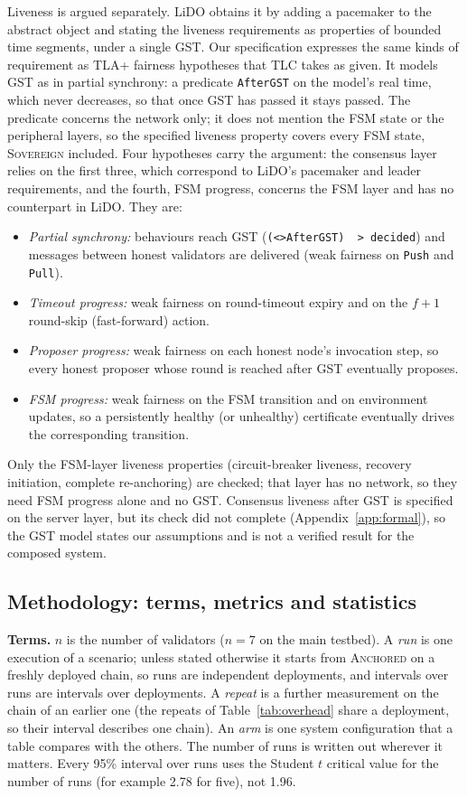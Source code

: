 Liveness is argued separately. LiDO obtains it by adding a pacemaker to the
abstract object and stating the liveness requirements as properties of
bounded time segments, under a single GST. Our specification expresses the
same kinds of requirement as TLA+ fairness hypotheses that TLC takes as given.
It models GST as in partial synchrony: a predicate \texttt{AfterGST} on the
model's real time, which never decreases, so that once GST has passed it stays
passed. The predicate concerns the network only; it does not mention the FSM
state or the peripheral layers, so the specified liveness property covers every
FSM state, \textsc{Sovereign} included. Four hypotheses carry the argument: the
consensus layer relies on the first three, which correspond to LiDO's pacemaker
and leader requirements, and the fourth, FSM progress, concerns the FSM layer and
has no counterpart in LiDO. They are:
\begin{itemize}
  \item \emph{Partial synchrony:} behaviours reach GST
  (\texttt{(<>AfterGST) \string~> decided}) and messages between honest
  validators are delivered (weak fairness on \texttt{Push} and \texttt{Pull}).
  \item \emph{Timeout progress:} weak fairness on round-timeout expiry and
  on the $f{+}1$ round-skip (fast-forward) action.
  \item \emph{Proposer progress:} weak fairness on each honest node's
  invocation step, so every honest proposer whose round is reached after
  GST eventually proposes.
  \item \emph{FSM progress:} weak fairness on the FSM transition and on
  environment updates, so a persistently healthy (or unhealthy)
  certificate eventually drives the corresponding transition.
\end{itemize}
Only the FSM-layer liveness properties (circuit-breaker liveness, recovery
initiation, complete re-anchoring) are checked; that layer has no network, so
they need FSM progress alone and no GST. Consensus liveness after GST is specified
on the server layer, but its check did not complete (Appendix~\ref{app:formal}),
so the GST model states our assumptions and is not a verified result for the
composed system.


\subsection*{Methodology: terms, metrics and statistics}

\textbf{Terms.} $n$ is the number of validators ($n{=}7$ on the main testbed). A \emph{run} is one execution of a
scenario; unless stated otherwise it starts from \textsc{Anchored} on a freshly
deployed chain, so runs are independent deployments, and intervals over runs
are intervals over deployments. A \emph{repeat} is a further measurement on the
chain of an earlier one (the repeats of Table~\ref{tab:overhead} share a
deployment, so their interval describes one chain). An \emph{arm} is one
system configuration that a table compares with the others. The number of runs
is written out wherever it matters. Every 95\% interval over runs uses the Student $t$
critical value for the number of runs (for example 2.78 for five), not 1.96.

